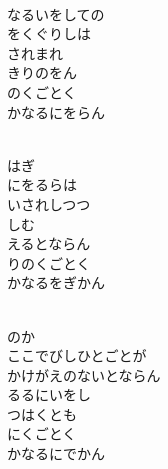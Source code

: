 \documentclass[10pt,b5j]{tarticle} %
\begin{document}
\vspace{1.5em} %
\newcommand{\linespace}{0.5em} %
\newcommand{\blocksize}{0.5\hsize} %
\newcommand{\itemmargin}{6em} %
\begin{enumerate} %
    \setlength{\itemindent}{\itemmargin} %
    \begin{minipage}[c]{\blocksize}
    
        \vspace{\linespace}
        \item~\\
        なるいをしての\\
        をくぐりしは\\
        されまれ\\
        きりのをん\\
        のくごとく\\
        かなるにをらん
        
        \vspace{\linespace}
        \item~\\
        はぎ\\
        にをるらは\\
        いされしつつ\\
        しむ\\
        えるとならん\\
        りのくごとく\\
        かなるをぎかん
        
        \vspace{\linespace}
        \item~\\
        のか\\
        ここでびしひとごとが\\
        かけがえのないとならん\\
        るるにいをし\\
        つはくとも\\
        にくごとく\\
        かなるにでかん

    
    \end{minipage}
\end{enumerate} %
\end{document}
